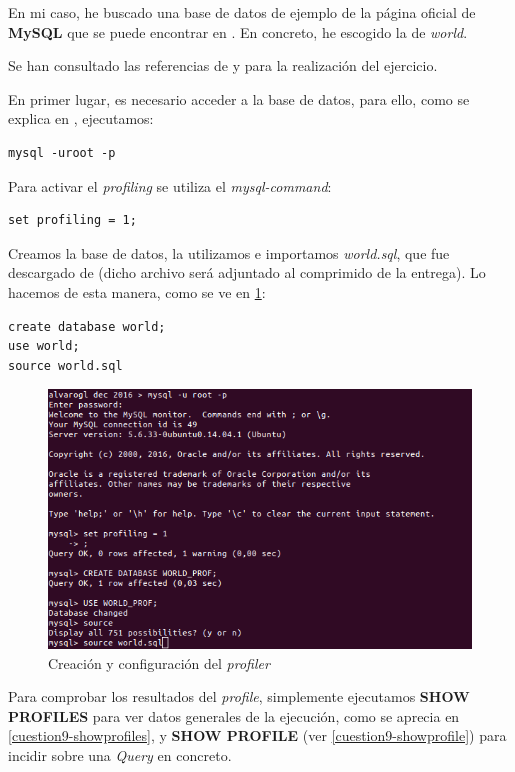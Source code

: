 En mi caso, he buscado una base de datos de ejemplo de la página oficial de \textbf{MySQL} que se puede encontrar en \cite{mysql-download}. En concreto, he escogido la de \textit{world}.

Se han consultado las referencias de \cite{mysql-profile} y \cite{mysql-profiles} para la realización del ejercicio.

En primer lugar, es necesario acceder a la base de datos, para ello, como se explica en \cite{mysql-guide}, ejecutamos:

\begin{verbatim}
mysql -uroot -p
\end{verbatim}

Para activar el \textit{profiling} se utiliza el \textit{mysql-command}:

\begin{verbatim}
set profiling = 1;
\end{verbatim}

Creamos la base de datos, la utilizamos e importamos \textit{world.sql}, que fue descargado de \cite{mysql-download} (dicho archivo será adjuntado al comprimido de la entrega). Lo hacemos de esta manera, como se ve en \ref{cuestion9-setprof-crear}:

\begin{verbatim}
create database world;
use world;
source world.sql
\end{verbatim}

\begin{figure}[H]
	\centering
	\includegraphics[scale=0.6]{cuestion9-setprof_crear.png}
	\caption{Creación y configuración del \textit{profiler}} \label{cuestion9-setprof-crear}
\end{figure}

Para comprobar los resultados del \textit{profile}, simplemente ejecutamos \textbf{SHOW PROFILES} para ver datos generales de la ejecución, como se aprecia en \ref{cuestion9-showprofiles}, y \textbf{SHOW PROFILE} (ver \ref{cuestion9-showprofile}) para incidir sobre una \textit{Query} en concreto.

